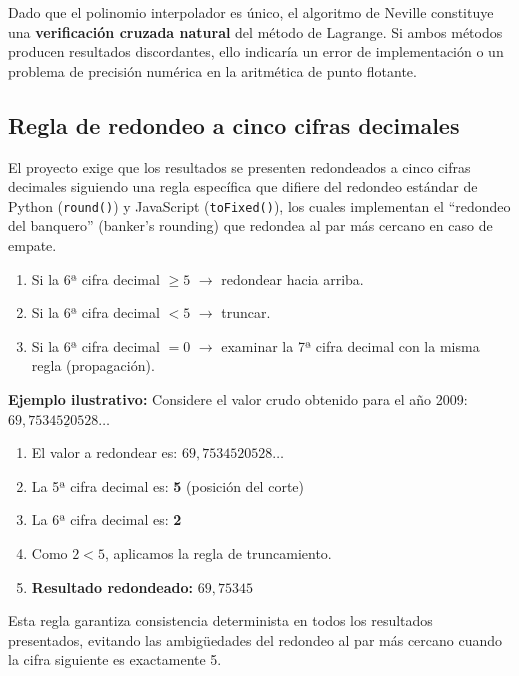 \documentclass[12pt, letterpaper]{article}
\begin{document}
Dado que el polinomio interpolador es único, el algoritmo de Neville constituye una \textbf{verificación cruzada natural} del método de Lagrange. Si ambos métodos producen resultados discordantes, ello indicaría un error de implementación o un problema de precisión numérica en la aritmética de punto flotante.

\subsection{Regla de redondeo a cinco cifras decimales}\label{subsec:redondeo}

El proyecto exige que los resultados se presenten redondeados a cinco cifras decimales siguiendo una regla específica que difiere del redondeo estándar de Python (\texttt{round()}) y JavaScript (\texttt{toFixed()}), los cuales implementan el ``redondeo del banquero'' (banker's rounding) que redondea al par más cercano en caso de empate.

\begin{tcolorbox}[colback=orange!10!white, colframe=orange!70!black, title=Regla de redondeo del proyecto]
\begin{enumerate}[leftmargin=1.5cm]
    \item Si la 6ª cifra decimal $\geq 5$ $\rightarrow$ redondear hacia arriba.
    \item Si la 6ª cifra decimal $< 5$ $\rightarrow$ truncar.
    \item Si la 6ª cifra decimal $= 0$ $\rightarrow$ examinar la 7ª cifra decimal con la misma regla (propagación).
\end{enumerate}
\end{tcolorbox}

\textbf{Ejemplo ilustrativo:} Considere el valor crudo obtenido para el año 2009: $69{,}75345\underline{2}0528\ldots$

\begin{enumerate}
    \item El valor a redondear es: $69{,}7534520528\ldots$
    \item La 5ª cifra decimal es: \textbf{5} (posición del corte)
    \item La 6ª cifra decimal es: \textbf{2}
    \item Como $2 < 5$, aplicamos la regla de truncamiento.
    \item \textbf{Resultado redondeado:} $69{,}75345$
\end{enumerate}

Esta regla garantiza consistencia determinista en todos los resultados presentados, evitando las ambigüedades del redondeo al par más cercano cuando la cifra siguiente es exactamente 5.
\end{document}
